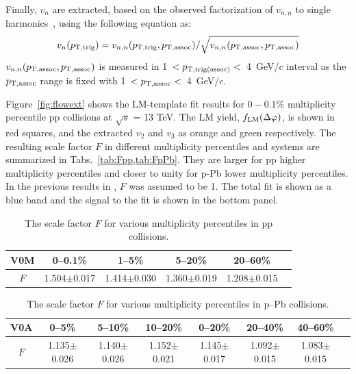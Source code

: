 Finally, $v_{n}$ are extracted, based on the observed factorization of $v_{n,n}$ to single harmonics~\cite{ATLAS:2015hzw,ATLAS:2016yzd}, using the following equation as:
\begin{eqnarray}
v_{n}(p_{\rm{T,trig}}) = v_{n,n}(p_{\rm{T,trig}}, p_{\rm{T,assoc}}) / \sqrt{ v_{n,n}(p_{\rm{T,assoc}},p_{\rm{T,assoc}})}
\end{eqnarray}
$v_{n,n}(p_{\rm{T,assoc}},p_{\rm{T,assoc}})$ is measured in 1~$<p_{\rm{T,trig(assoc)}}<$~4~GeV/$c$ interval as the $p_{\rm{T,assoc}}$ range is fixed with 1~$<p_{\rm{T,assoc}}<$~4~GeV/$c$.

Figure~\ref{fig:flowext} shows the LM-template fit results for $0-0.1\%$ multiplicity percentile pp collisions at $\sqrt{s}$ = 13 TeV. The LM yield,  $f_{\rm{LM}}(\Delta\varphi)$, is shown in red squares, and the extracted $v_{2}$ and $v_{3}$ as orange and green respectively. The resulting scale factor $F$ in different multiplicity percentiles and systems are summarized in Tabs.~\ref{tab:Fpp,tab:FpPb}. They are larger for pp higher multiplicity percentiles and closer to unity for p-Pb lower multiplicity percentiles. In the previous results in \cite{ALICE:2012eyl, ALICE:2013snk}, $F$ was assumed to be 1. The total fit is shown as a blue band and the signal to the fit is shown in the bottom panel. 
\begin{table}
\centering
\begin{tabular}{|c|cccc|c}
%
\hline
 V0M& 0--0.1\% & 1--5\% & 5--20\% & 20--60\% \\ 
 \hline
 $F$ & 1.504$\pm$0.017 & 1.414$\pm$0.030 & 1.360$\pm$0.019 & 1.208$\pm$0.015 \\  
 \hline
 \end{tabular}
\label{tab:Fpp}
\caption{The scale factor $F$ for various multiplicity percentiles in pp collisions.}
\end{table}

\begin{table}
\centering
 \begin{tabular}{|c|cccccc|c}
 \hline
 V0A& 0--5\% & 5--10\% & 10--20\% & 0--20\% & 20--40\% & 40--60\% \\ 
 \hline
 $F$& 1.135$\pm$0.026 & 1.140$\pm$0.026 & 1.152$\pm$0.021 & 1.145$\pm$0.017 &1.092$\pm$0.015 & 1.083$\pm$0.015 \\  
 \hline
\end{tabular}
\label{tab:FpPb}
\caption{The scale factor $F$ for various multiplicity percentiles in p--Pb collisions.}
\end{table}

